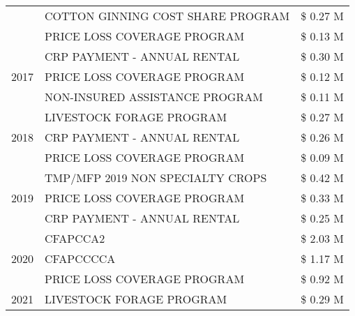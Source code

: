 \begin{tabular}{llr}
 & COTTON GINNING COST SHARE PROGRAM & \$ 0.27 M \\
 & PRICE LOSS COVERAGE PROGRAM & \$ 0.13 M \\
\cline{1-3}
\multirow[t]{3}{*}{2017} & CRP PAYMENT - ANNUAL RENTAL & \$ 0.30 M \\
 & PRICE LOSS COVERAGE PROGRAM & \$ 0.12 M \\
 & NON-INSURED ASSISTANCE PROGRAM & \$ 0.11 M \\
\cline{1-3}
\multirow[t]{3}{*}{2018} & LIVESTOCK FORAGE PROGRAM & \$ 0.27 M \\
 & CRP PAYMENT - ANNUAL RENTAL & \$ 0.26 M \\
 & PRICE LOSS COVERAGE PROGRAM & \$ 0.09 M \\
\cline{1-3}
\multirow[t]{3}{*}{2019} & TMP/MFP 2019 NON SPECIALTY CROPS & \$ 0.42 M \\
 & PRICE LOSS COVERAGE PROGRAM & \$ 0.33 M \\
 & CRP PAYMENT - ANNUAL RENTAL & \$ 0.25 M \\
\cline{1-3}
\multirow[t]{3}{*}{2020} & CFAPCCA2 & \$ 2.03 M \\
 & CFAPCCCCA & \$ 1.17 M \\
 & PRICE LOSS COVERAGE PROGRAM & \$ 0.92 M \\
\cline{1-3}
2021 & LIVESTOCK FORAGE PROGRAM & \$ 0.29 M \\
\cline{1-3}
\bottomrule
\end{tabular}
